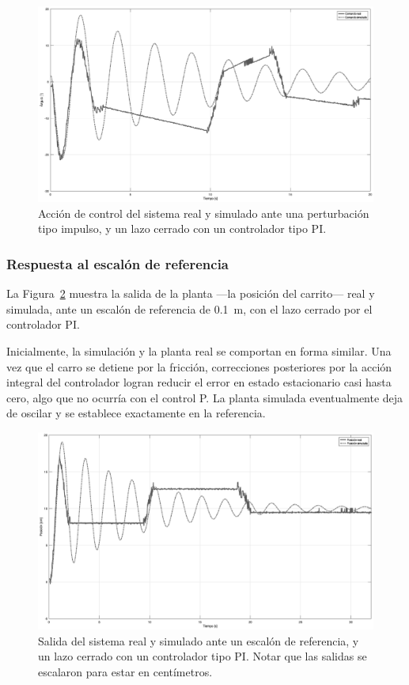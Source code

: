 \begin{figure}[!htbp]
    \centering
    \includegraphics[width=\linewidth]{img/pi-pert-cont.eps}
    \caption{Acción de control del sistema real y simulado ante una perturbación tipo impulso, y un lazo cerrado con un controlador tipo PI.}
    \label{fig:pi-pert-cont}
\end{figure}

\subsubsection{Respuesta al escalón de referencia}

La Figura~\ref{fig:pi-ref-salida} muestra la salida de la planta ---la posición del carrito--- real y simulada, ante un escalón de referencia de \qty{0.1}{\m}, con el lazo cerrado por el controlador PI.

Inicialmente, la simulación y la planta real se comportan en forma similar. Una vez que el carro se detiene por la fricción, correcciones posteriores por la acción integral del controlador logran reducir el error en estado estacionario casi hasta cero, algo que no ocurría con el control P. La planta simulada eventualmente deja de oscilar y se establece exactamente en la referencia.

\begin{figure}[!htbp]
    \centering
    \includegraphics[width=\linewidth]{img/pi-ref-salida.eps}
    \caption{Salida del sistema real y simulado ante un escalón de referencia, y un lazo cerrado con un controlador tipo PI. Notar que las salidas se escalaron para estar en centímetros.}
    \label{fig:pi-ref-salida}
\end{figure}

